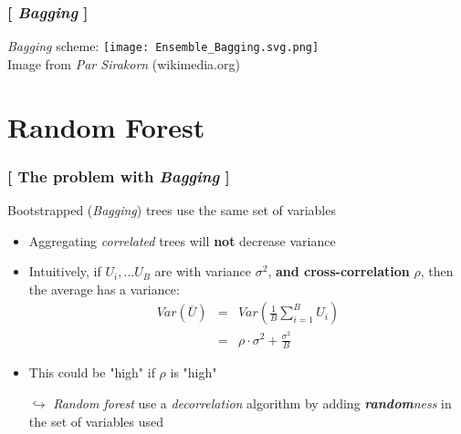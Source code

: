 \documentclass[xcolor=x11names,compress, handhouts]{beamer}
\renewcommand{\(}{\begin{columns}}
\renewcommand{\)}{\end{columns}}
\newcommand{\<}[1]{\begin{column}{#1}}
\renewcommand{\>}{\end{column}}
\begin{document}
\begin{frame}
\frametitle{\textcolor{brique}{[ \textit{Bagging} ]}}
\textit{Bagging} scheme:
\texttt{[image: Ensemble\_Bagging.svg.png]}\\
\vfill
 \textcolor{gris}{\small Image from \textit{Par Sirakorn} (wikimedia.org) }
\end{frame}


\section{Random Forest}


\begin{frame}
\frametitle{\textcolor{brique}{[ The problem with \textit{Bagging} ]}}
 Bootstrapped (\textit{Bagging}) trees use the same set of variables
\pause
\begin{itemize}[<+->]
    \item Aggregating  \textit{correlated} trees  will \textbf{not}  decrease variance
    \item   Intuitively, if $U_{i}, \ldots U_{B}$ are with variance $\sigma^{2}$, \textbf{and cross-correlation} $\rho$,   then the average has a variance:
\begin{eqnarray*}
Var ( \overline{U}) &=&  Var \left( \frac{1}{B} \sum_{i=1}^{B} U_i \right) \\
            &=&   \rho \cdot \sigma^{2} + \frac{\sigma^{2}}{B}
\end{eqnarray*}
    \item This could be "high" if $\rho$ is "high"
    \item[$\hookrightarrow$] \textit{Random forest }use a \textit{decorrelation} algorithm by adding \textit{\textbf{random}ness} in the set of variables used
\end{itemize}
\end{frame}
\end{document}
